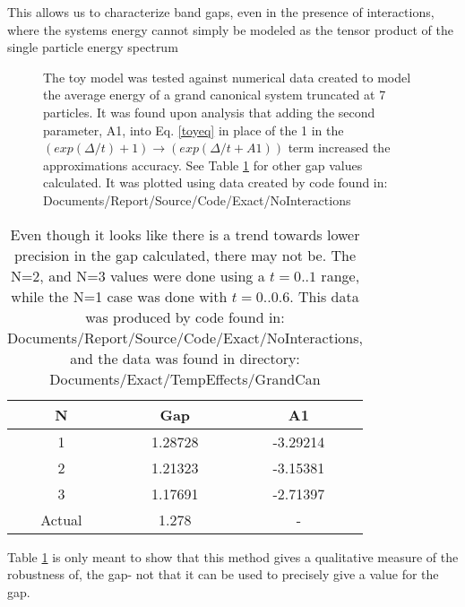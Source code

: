 \documentclass[12pt]{article}
\begin{document}
This allows us to characterize band gaps, even in the presence of interactions,
where the systems energy cannot simply be modeled as the tensor product
of the single particle energy spectrum
\begin{figure}[H]
	\centerline{}
	\caption{ The toy model was tested against  numerical data created to 
          model the average energy of a grand
          canonical system truncated at 7 particles. It was found upon
          analysis that adding the second parameter, A1, into Eq. \ref{toyeq}
          in place of the 1 in the $(exp(\Delta/t)+1) \rightarrow
          (exp(\Delta/t+A1))$ term increased the approximations accuracy.
          See Table \ref{Nenergytble} for other gap values calculated.
          It was plotted using data created by code found in:
          Documents/Report/Source/Code/Exact/NoInteractions
        }
          
           
	\label{toytestN1}
\end{figure}

\begin{table}[H]
\centering
 \begin{tabular}{c c c} 
   N & Gap & A1 \\ \hline \hline
   1 & 1.28728 & -3.29214 \\
   2 & 1.21323 & -3.15381 \\
   3 & 1.17691 & -2.71397 \\ \hline \hline
   Actual & 1.278 & - \\ \hline
 \end{tabular}
\caption{Even though it looks like there is a trend towards lower precision in
  the gap calculated, there may not be. The N=2, and N=3 values were done using
a $t=0..1$ range, while the N=1 case was done with $t=0..0.6$.
This data was produced by code found in: \\
 Documents/Report/Source/Code/Exact/NoInteractions, and the data was found in
directory: \\
Documents/Exact/TempEffects/GrandCan} \label{Nenergytble}
\end{table}



Table \ref{Nenergytble} is only meant to show that this method gives a
qualitative measure of the robustness of, the gap- not that it can be used to
precisely give a value for the gap.

\end{document}

